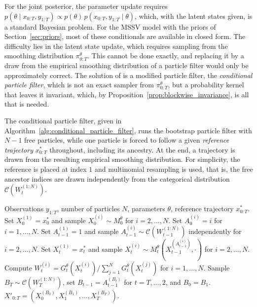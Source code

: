 For the joint posterior, the parameter update requires $p(\theta\mid x_{0:T},y_{1:T})\propto p(\theta)\,p(x_{0:T},y_{1:T}\mid\theta)$, which, with the latent states given, is a standard Bayesian problem. For the MSSV model with the priors of Section~\ref{sec:priors}, most of these conditionals are available in closed form. The difficulty lies in the latent state update, which requires sampling from the smoothing distribution $\pi_{0:T}^\theta$. This cannot be done exactly, and replacing it by a draw from the empirical smoothing distribution of a particle filter would only be approximately correct. The solution of \cite{andrieu2010particle} is a modified particle filter, the \emph{conditional particle filter}, which is not an exact sampler from $\pi_{0:T}^\theta$, but a probability kernel that leaves it invariant, which, by Proposition~\ref{prop:blockwise_invariance}, is all that is needed.

The conditional particle filter, given in Algorithm~\ref{alg:conditional_particle_filter}, runs the bootstrap particle filter with $N-1$ free particles, while one particle is forced to follow a given \emph{reference trajectory} $x_{0:T}^*$ throughout, including its ancestry. At the end, a trajectory is drawn from the resulting empirical smoothing distribution. For simplicity, the reference is placed at index $1$ and multinomial resampling is used, that is, the free ancestor indices are drawn independently from the categorical distribution $\mathcal{C}(W_t^{(1:N)})$.

\begin{algorithm}[H]
\caption{Conditional bootstrap particle filter}
\label{alg:conditional_particle_filter}
\begin{algorithmic}[1]
    \REQUIRE Observations $y_{1:T}$, number of particles $N$, parameters $\theta$, reference trajectory $x_{0:T}^*$.
    \STATE Set $X_0^{(1)} = x_0^*$ and sample $X_0^{(i)}\sim M_0^\theta$ for $i=2,\ldots,N$.
    \STATE Set $A_0^{(i)} = i$ for $i=1,\ldots,N$.
            \STATE Set $A_{t-1}^{(1)} = 1$ and sample $A_{t-1}^{(i)}\sim\mathcal{C}(W_{t-1}^{(1:N)})$ independently for $i=2,\ldots,N$.
        \ENDIF
        \STATE Set $X_t^{(1)} = x_t^*$ and sample $X_t^{(i)}\sim M_t^\theta(X_{t-1}^{(A_{t-1}^{(i)})},\cdot)$ for $i=2,\ldots,N$.
        \STATE Compute $W_t^{(i)} = G_t^\theta(X_t^{(i)})/\sum_{j=1}^{N}G_t^\theta(X_t^{(j)})$ for $i=1,\ldots,N$.
    \ENDFOR
    \STATE Sample $B_T\sim\mathcal{C}(W_T^{(1:N)})$, set $B_{t-1} = A_{t-1}^{(B_t)}$ for $t=T,\ldots,2$, and $B_0 = B_1$.
    \RETURN $X'_{0:T} = \left(X_0^{(B_0)},X_1^{(B_1)},\ldots,X_T^{(B_T)}\right)$.
\end{algorithmic}
\end{algorithm}

